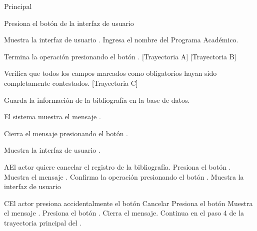 \begin{UCtrayectoria}{Principal}

    \UCpaso[\UCactor] Presiona el botón  de la interfaz de usuario 

    \UCpaso Muestra la interfaz de usuario .
    \UCpaso[\UCactor] Ingresa el nombre del Programa Académico.
 
    \UCpaso[\UCactor] Termina la operación presionando el botón . [Trayectoria A] [Trayectoria B]

    \UCpaso Verifica que todos los campos marcados como obligatorios hayan sido completamente contestados. [Trayectoria C]
    
    \UCpaso Guarda la información de la bibliografía en la base de datos.

    \UCpaso El sistema muestra el mensaje .

    \UCpaso[\UCactor] Cierra el mensaje presionando el botón .

    \UCpaso Muestra la interfaz de usuario .
\end{UCtrayectoria}




\begin{UCtrayectoriaA}{A}{El actor quiere cancelar el registro de la bibliografía.}
	\UCpaso[\UCactor] Presiona el botón .
    \UCpaso Muestra el mensaje .
    \UCpaso[\UCactor] Confirma la operación presionando el botón .
    \UCpaso Muestra la interfaz de usuario 
\end{UCtrayectoriaA}



\begin{UCtrayectoriaA}{C}{El actor presiona accidentalmente el botón Cancelar}
	\UCpaso[\UCactor] Presiona el botón 
    \UCpaso Muestra el mensaje .
    \UCpaso[\UCactor] Presiona el botón .
    \UCpaso Cierra el mensaje.
    \UCpaso Continua en el paso 4 de la trayectoria principal del .
\end{UCtrayectoriaA}

